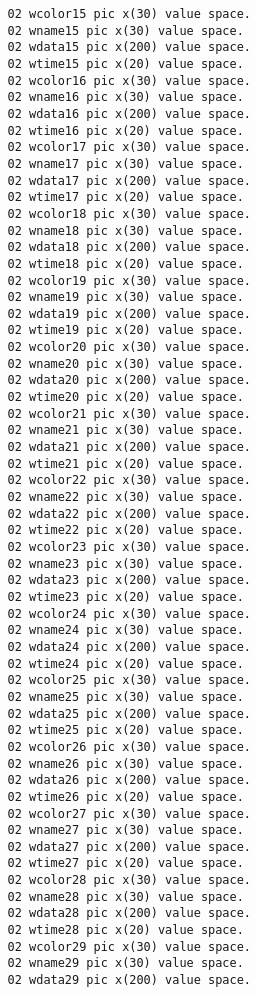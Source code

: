 {{{\begin{verbatim}
          02 wcolor15 pic x(30) value space.
          02 wname15 pic x(30) value space.
          02 wdata15 pic x(200) value space.
          02 wtime15 pic x(20) value space.
          02 wcolor16 pic x(30) value space.
          02 wname16 pic x(30) value space.
          02 wdata16 pic x(200) value space.
          02 wtime16 pic x(20) value space.
          02 wcolor17 pic x(30) value space.
          02 wname17 pic x(30) value space.
          02 wdata17 pic x(200) value space.
          02 wtime17 pic x(20) value space.
          02 wcolor18 pic x(30) value space.
          02 wname18 pic x(30) value space.
          02 wdata18 pic x(200) value space.
          02 wtime18 pic x(20) value space.
          02 wcolor19 pic x(30) value space.
          02 wname19 pic x(30) value space.
          02 wdata19 pic x(200) value space.
          02 wtime19 pic x(20) value space.
          02 wcolor20 pic x(30) value space.
          02 wname20 pic x(30) value space.
          02 wdata20 pic x(200) value space.
          02 wtime20 pic x(20) value space.
          02 wcolor21 pic x(30) value space.
          02 wname21 pic x(30) value space.
          02 wdata21 pic x(200) value space.
          02 wtime21 pic x(20) value space.
          02 wcolor22 pic x(30) value space.
          02 wname22 pic x(30) value space.
          02 wdata22 pic x(200) value space.
          02 wtime22 pic x(20) value space.
          02 wcolor23 pic x(30) value space.
          02 wname23 pic x(30) value space.
          02 wdata23 pic x(200) value space.
          02 wtime23 pic x(20) value space.
          02 wcolor24 pic x(30) value space.
          02 wname24 pic x(30) value space.
          02 wdata24 pic x(200) value space.
          02 wtime24 pic x(20) value space.
          02 wcolor25 pic x(30) value space.
          02 wname25 pic x(30) value space.
          02 wdata25 pic x(200) value space.
          02 wtime25 pic x(20) value space.
          02 wcolor26 pic x(30) value space.
          02 wname26 pic x(30) value space.
          02 wdata26 pic x(200) value space.
          02 wtime26 pic x(20) value space.
          02 wcolor27 pic x(30) value space.
          02 wname27 pic x(30) value space.
          02 wdata27 pic x(200) value space.
          02 wtime27 pic x(20) value space.
          02 wcolor28 pic x(30) value space.
          02 wname28 pic x(30) value space.
          02 wdata28 pic x(200) value space.
          02 wtime28 pic x(20) value space.
          02 wcolor29 pic x(30) value space.
          02 wname29 pic x(30) value space.
          02 wdata29 pic x(200) value space.

\end{verbatim}}}}
